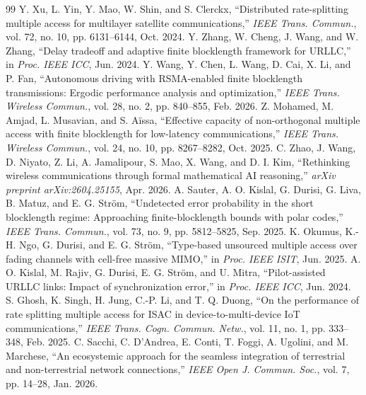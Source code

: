 \documentclass[journal]{IEEEtran}
\begin{document}
\begin{thebibliography}{99}
 Y. Xu, L. Yin, Y. Mao, W. Shin, and S. Clerckx, ``Distributed rate-splitting multiple access for multilayer satellite communications,'' \emph{IEEE Trans. Commun.}, vol. 72, no. 10, pp. 6131--6144, Oct. 2024.
 Y. Zhang, W. Cheng, J. Wang, and W. Zhang, ``Delay tradeoff and adaptive finite blocklength framework for URLLC,'' in \emph{Proc. IEEE ICC}, Jun. 2024.
 Y. Wang, Y. Chen, L. Wang, D. Cai, X. Li, and P. Fan, ``Autonomous driving with RSMA-enabled finite blocklength transmissions: Ergodic performance analysis and optimization,'' \emph{IEEE Trans. Wireless Commun.}, vol. 28, no. 2, pp. 840--855, Feb. 2026.
 Z. Mohamed, M. Amjad, L. Musavian, and S. Aïssa, ``Effective capacity of non-orthogonal multiple access with finite blocklength for low-latency communications,'' \emph{IEEE Trans. Wireless Commun.}, vol. 24, no. 10, pp. 8267--8282, Oct. 2025.
 C. Zhao, J. Wang, D. Niyato, Z. Li, A. Jamalipour, S. Mao, X. Wang, and D. I. Kim, ``Rethinking wireless communications through formal mathematical AI reasoning,'' \emph{arXiv preprint arXiv:2604.25155}, Apr. 2026.
 A. Sauter, A. O. Kislal, G. Durisi, G. Liva, B. Matuz, and E. G. Ström, ``Undetected error probability in the short blocklength regime: Approaching finite-blocklength bounds with polar codes,'' \emph{IEEE Trans. Commun.}, vol. 73, no. 9, pp. 5812--5825, Sep. 2025.
 K. Okumus, K.-H. Ngo, G. Durisi, and E. G. Ström, ``Type-based unsourced multiple access over fading channels with cell-free massive MIMO,'' in \emph{Proc. IEEE ISIT}, Jun. 2025.
 A. O. Kislal, M. Rajiv, G. Durisi, E. G. Ström, and U. Mitra, ``Pilot-assisted URLLC links: Impact of synchronization error,'' in \emph{Proc. IEEE ICC}, Jun. 2024.
 S. Ghosh, K. Singh, H. Jung, C.-P. Li, and T. Q. Duong, ``On the performance of rate splitting multiple access for ISAC in device-to-multi-device IoT communications,'' \emph{IEEE Trans. Cogn. Commun. Netw.}, vol. 11, no. 1, pp. 333--348, Feb. 2025.
 C. Sacchi, C. D'Andrea, E. Conti, T. Foggi, A. Ugolini, and M. Marchese, ``An ecosystemic approach for the seamless integration of terrestrial and non-terrestrial network connections,'' \emph{IEEE Open J. Commun. Soc.}, vol. 7, pp. 14--28, Jan. 2026.


\end{thebibliography}
\end{document}
